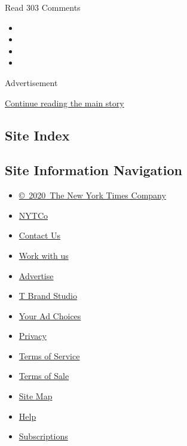 Read 303 Comments

\begin{itemize}
\item
\item
\item
\item
\end{itemize}

Advertisement

\protect\hyperlink{after-bottom}{Continue reading the main story}

\hypertarget{site-index}{%
\subsection{Site Index}\label{site-index}}

\hypertarget{site-information-navigation}{%
\subsection{Site Information
Navigation}\label{site-information-navigation}}

\begin{itemize}
\tightlist
\item
  \href{https://help.nytimes.com/hc/en-us/articles/115014792127-Copyright-notice}{©~2020~The
  New York Times Company}
\end{itemize}

\begin{itemize}
\tightlist
\item
  \href{https://www.nytco.com/}{NYTCo}
\item
  \href{https://help.nytimes.com/hc/en-us/articles/115015385887-Contact-Us}{Contact
  Us}
\item
  \href{https://www.nytco.com/careers/}{Work with us}
\item
  \href{https://nytmediakit.com/}{Advertise}
\item
  \href{http://www.tbrandstudio.com/}{T Brand Studio}
\item
  \href{https://www.nytimes.com/privacy/cookie-policy\#how-do-i-manage-trackers}{Your
  Ad Choices}
\item
  \href{https://www.nytimes.com/privacy}{Privacy}
\item
  \href{https://help.nytimes.com/hc/en-us/articles/115014893428-Terms-of-service}{Terms
  of Service}
\item
  \href{https://help.nytimes.com/hc/en-us/articles/115014893968-Terms-of-sale}{Terms
  of Sale}
\item
  \href{https://spiderbites.nytimes.com}{Site Map}
\item
  \href{https://help.nytimes.com/hc/en-us}{Help}
\item
  \href{https://www.nytimes.com/subscription?campaignId=37WXW}{Subscriptions}
\end{itemize}
